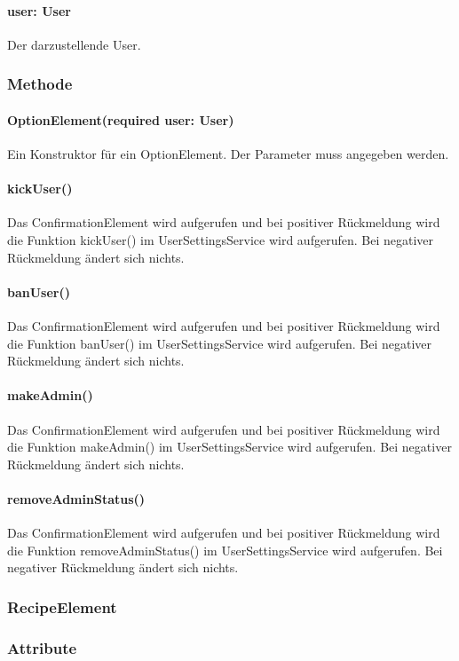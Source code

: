 \documentclass[parskip=full]{scrartcl}
\begin{document}
            \paragraph*{user: User} Der darzustellende User.

        \subsubsection*{Methode}
            \paragraph*{OptionElement(required user: User)} Ein Konstruktor für ein OptionElement. Der Parameter muss angegeben werden. 
            \paragraph*{kickUser()} Das ConfirmationElement wird aufgerufen und bei positiver Rückmeldung wird die Funktion kickUser() im UserSettingsService wird aufgerufen. Bei negativer Rückmeldung ändert sich nichts.
            \paragraph*{banUser()} Das ConfirmationElement wird aufgerufen und bei positiver Rückmeldung wird die Funktion banUser() im UserSettingsService wird aufgerufen. Bei negativer Rückmeldung ändert sich nichts.
            \paragraph*{makeAdmin()} Das ConfirmationElement wird aufgerufen und bei positiver Rückmeldung wird die Funktion makeAdmin() im UserSettingsService wird aufgerufen. Bei negativer Rückmeldung ändert sich nichts.
            \paragraph*{removeAdminStatus()} Das ConfirmationElement wird aufgerufen und bei positiver Rückmeldung wird die Funktion removeAdminStatus() im UserSettingsService wird aufgerufen. Bei negativer Rückmeldung ändert sich nichts.


    \subsubsection{RecipeElement} \label{sec:RecipeElement}
        \subsubsection*{Attribute}
\end{document}
